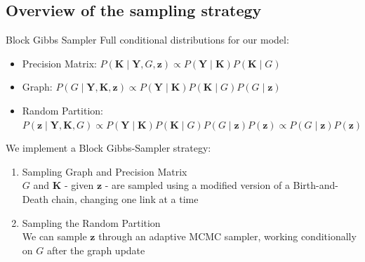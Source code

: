 \subsection{Overview of the sampling strategy}
\begin{frame}{Block Gibbs Sampler}
    Full conditional distributions for our model:
    \begin{itemize}
        \item Precision Matrix: $P(\bm{K} \mid \bm{Y},G,\bm{z}) \propto P(\bm{Y} \mid \bm{K})P(\bm{K} \mid {G})$ 

        \item Graph: $P(G \mid \bm{Y},\bm{K},\bm{z}) \propto P(\bm{Y} \mid \bm{K})P(\bm{K} \mid {G})P(G \mid \bm{z})$ 

        \item Random Partition: $P(\bm{z} \mid \bm{Y},\bm{K},G) \propto P(\bm{Y} \mid \bm{K})P(\bm{K} \mid {G})P(G \mid \bm{z})P(\bm{z}) \propto P(G \mid \bm{z})P(\bm{z}) $
    \end{itemize}

    \pause 

    We implement a Block Gibbs-Sampler strategy:
    \begin{enumerate}
        \item \alert{Sampling Graph and Precision Matrix}\\
        $G$ and $\bm{K}$ - given $\bm{z}$ - are sampled using a modified version of a Birth-and-Death chain, changing one link at a time
        \item \alert{Sampling the Random Partition}\\
        We can sample $\bm{z}$ through an adaptive MCMC\vphantom{changepoint} sampler, working conditionally on $G$ after the graph update
    \end{enumerate}
\end{frame}




